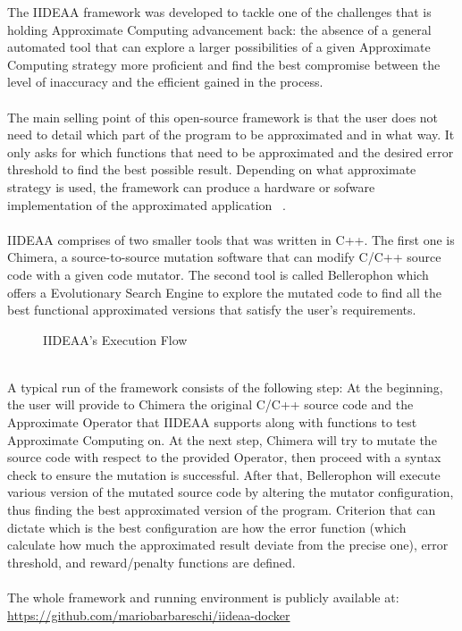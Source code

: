 The IIDEAA framework was developed to tackle one of the challenges that is holding Approximate Computing advancement back: the absence of a general automated tool that can explore a larger possibilities of a given Approximate Computing strategy more proficient and find the best compromise between the level of inaccuracy and the efficient gained in the process. \\
~\\
The main selling point of this open-source framework is that the user does not need to detail which part of the program to be approximated and in what way. It only asks for which functions that need to be approximated and the desired error threshold to find the best possible result. Depending on what approximate strategy is used, the framework can produce a hardware or sofware implementation of the approximated application ~\cite{iideaa}. \\
~\\
IIDEAA comprises of two smaller tools that was written in C++. The first one is Chimera, a source-to-source mutation software that can modify C/C++ source code with a given code mutator. The second tool is called Bellerophon which offers a Evolutionary Search Engine to explore the mutated code to find all the best functional approximated versions that satisfy the user's requirements. \\
\begin{figure}[H]
\centering
\caption{IIDEAA's Execution Flow}
\end{figure}
~\\
A typical run of the framework consists of the following step: At the beginning, the user will provide to Chimera the original C/C++ source code  and the Approximate Operator that IIDEAA supports along with functions to test Approximate Computing on. At the next step, Chimera will try to mutate the source code with respect to the provided Operator, then proceed with a syntax check to ensure the mutation is successful. After that, Bellerophon will execute various version of the mutated source code by altering the mutator configuration, thus finding the best approximated version of the program. Criterion that can dictate which is the best configuration are how the error function (which calculate how much the approximated result deviate from the precise one), error threshold, and reward/penalty functions are defined. \\
~\\
The whole framework and running environment is publicly available at: \url{https://github.com/mariobarbareschi/iideaa-docker}

